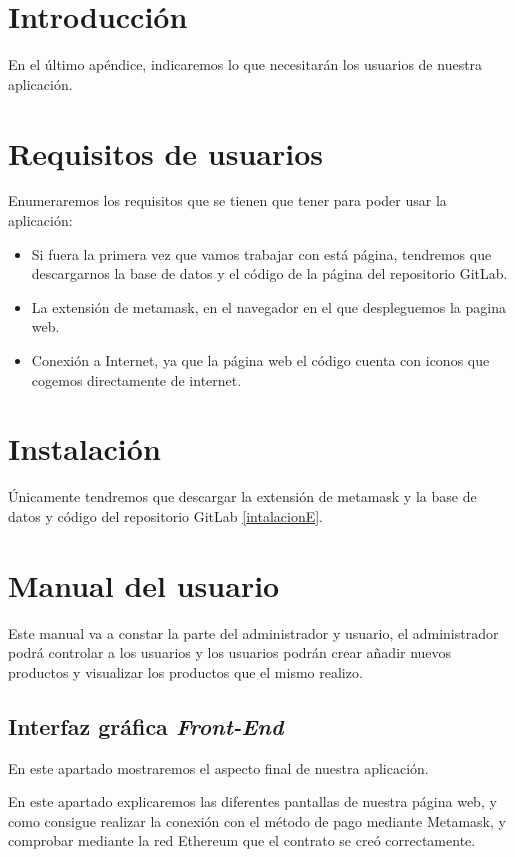 
\section{Introducción}

En el último apéndice, indicaremos lo que necesitarán los usuarios de nuestra aplicación.

\section{Requisitos de usuarios}
 Enumeraremos los requisitos que se tienen que tener para poder usar la aplicación:
\begin{itemize}
 \item Si fuera la primera vez que vamos trabajar con está página, tendremos que descargarnos la base de datos y el código de la página del repositorio GitLab.
 \item La extensión de metamask, en el navegador en el que despleguemos la pagina web.
 \item Conexión a Internet, ya que la página web el código cuenta con iconos que cogemos directamente de internet.
\end{itemize}
 
\section{Instalación}

Únicamente tendremos que descargar la extensión de metamask y la base de datos y código del repositorio GitLab \ref{intalacionE}.

\section{Manual del usuario}

Este manual va a constar la parte del administrador y usuario, el administrador podrá controlar a los usuarios y los usuarios podrán crear añadir nuevos productos y visualizar los productos que el mismo realizo. 

\subsection{Interfaz gráfica \textit{Front-End}\label{ref:front}}

En este apartado mostraremos el aspecto final de nuestra aplicación.

En este apartado explicaremos las diferentes pantallas de nuestra página web, y como consigue realizar la conexión con el método de pago mediante Metamask, y comprobar mediante la red Ethereum que el contrato se creó correctamente.


